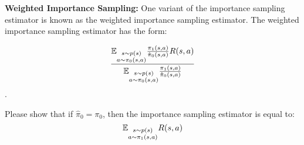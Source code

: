 \item   {} \textbf{Weighted Importance Sampling:} One variant of the importance sampling estimator is known as the weighted importance sampling estimator. The weighted importance sampling estimator has the form: 

$$\frac{\mathbb{E}_{\substack{s\sim p(s) \\ a \sim \pi_0(s, a)}} \frac{\pi_1(s, a)}{\hat{\pi}_0(s, a)} R(s, a)}{\mathbb{E}_{\substack{s\sim p(s) \\ a \sim \pi_0(s, a)}} \frac{\pi_1(s, a)}{\hat{\pi}_0(s, a)}}$$.

 Please show that if $\hat{\pi}_0 = \pi_0$, then the importance sampling estimator is equal to: 
$$\mathbb{E}_{\substack{s\sim p(s) \\ a \sim \pi_1(s, a)}} R(s, a)$$
